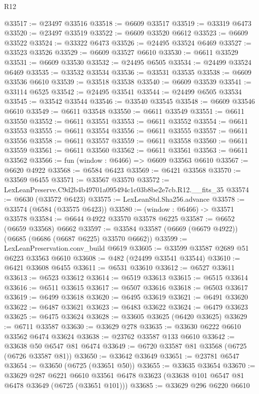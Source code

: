 \begin{lexlean}{R12}
\begin{coremodule}
@33517 := @23497 @33516
@33518 := @6609 @33517
@33519 := @33319 @6473
@33520 := @23497 @33519
@33522 := @6609 @33520 @6612
@33523 := @6609 @33522
@33524 := @33322 @6473
@33526 := @24495 @33524 @6469
@33527 := @33523 @33526
@33529 := @6609 @33527 @6610
@33530 := @6611 @33529
@33531 := @6609 @33530
@33532 := @24495 @6505
@33534 := @24499 @33524 @6469
@33535 := @33532 @33534
@33536 := @33531 @33535
@33538 := @6609 @33536 @6610
@33539 := @33518 @33538
@33540 := @6609 @33539
@33541 := @33114 @6525
@33542 := @24495 @33541
@33544 := @24499 @6505 @33534
@33545 := @33542 @33544
@33546 := @33540 @33545
@33548 := @6609 @33546 @6610
@33549 := @6611 @33548
@33550 := @6611 @33549
@33551 := @6611 @33550
@33552 := @6611 @33551
@33553 := @6611 @33552
@33554 := @6611 @33553
@33555 := @6611 @33554
@33556 := @6611 @33555
@33557 := @6611 @33556
@33558 := @6611 @33557
@33559 := @6611 @33558
@33560 := @6611 @33559
@33561 := @6611 @33560
@33562 := @6611 @33561
@33563 := @6611 @33562
@33566 := fun (window : @6466) => @6609 @33563 @6610
@33567 := @6620 @4922
@33568 := @6584 @6423
@33569 := @6421 @33568
@33570 := @33569 @6455
@33571 := @33567 @33570
@33572 := LexLeanPreserve.C9d2b4b49701a095494c1c03b8be2e7cb.R12.__fits_35
@33574 := @6630 (@33572 @6423)
@33575 := LexLeanStd.Sha256.advance
@33578 := @33574 (@6584 (@33575 @6423))
@33580 := (window : @6466) -> @33571 @33578
@33584 := @6644 @4922 @33570 @33578 @6225
@33587 := @6652 (@6659 @33568) @6662
@33597 := @33584 @33587 (@6669 (@6679 @4922)) (@6685 (@6686 (@6687 @6225) @33570 @6662))
@33599 := LexLeanPreservation.conv_build @6619
@33605 := @33599 @33587 @2689 @51 @6223 @33563 @6610
@33608 := @482 (@24499 @33541 @33544)
@33610 := @6421 @33608 @6455
@33611 := @6531 @33610
@33612 := @6527 @33611
@33613 := @6523 @33612
@33614 := @6519 @33613
@33615 := @6515 @33614
@33616 := @6511 @33615
@33617 := @6507 @33616
@33618 := @6503 @33617
@33619 := @6499 @33618
@33620 := @6495 @33619
@33621 := @6491 @33620
@33622 := @6487 @33621
@33623 := @6483 @33622
@33624 := @6479 @33623
@33625 := @6475 @33624
@33628 := @33605 @33625 (@6420 @33625)
@33629 := @6711 @33587
@33630 := @33629 @278
@33635 := @33630 @6222 @6610 @33562 @6474 @33624
@33638 := @23762 @33587 @133 @6610
@33642 := @33638 @50 @6547 @81 @6474
@33649 := @6720 @33587 @81 @33568 (@6725 (@6726 @33587 @81))
@33650 := @33642 @33649
@33651 := @23781 @6547
@33654 := @33650 (@6725 (@33651 @50))
@33655 := @33635 @33654
@33670 := @33629
    @287
    @6221
    @6610
    @33561
    @6478
    @33623
    (@33638 @101 @6547 @81 @6478 @33649 (@6725 (@33651 @101)))
@33685 := @33629
    @296
    @6220
    @6610

\end{coremodule}
\end{lexlean}

